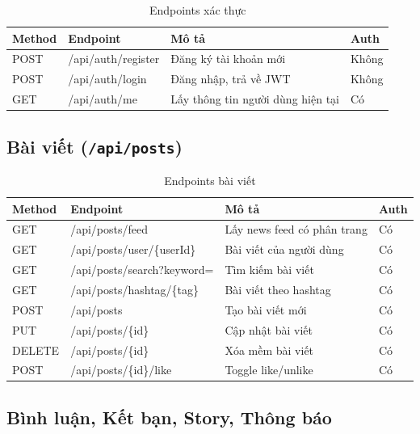\documentclass[a4paper]{article}
\begin{document}
\begin{table}[h!]
\centering
\caption{Endpoints xác thực}
\begin{tabularx}{\textwidth}{|l|l|X|l|}
\hline
\textbf{Method} & \textbf{Endpoint} & \textbf{Mô tả} & \textbf{Auth} \\
\hline
POST & /api/auth/register & Đăng ký tài khoản mới & Không \\
\hline
POST & /api/auth/login & Đăng nhập, trả về JWT & Không \\
\hline
GET & /api/auth/me & Lấy thông tin người dùng hiện tại & Có \\
\hline
\end{tabularx}
\end{table}

\subsection{Bài viết (\texttt{/api/posts})}

\begin{table}[h!]
\centering
\caption{Endpoints bài viết}
\begin{tabularx}{\textwidth}{|l|l|X|l|}
\hline
\textbf{Method} & \textbf{Endpoint} & \textbf{Mô tả} & \textbf{Auth} \\
\hline
GET & /api/posts/feed & Lấy news feed có phân trang & Có \\
\hline
GET & /api/posts/user/\{userId\} & Bài viết của người dùng & Có \\
\hline
GET & /api/posts/search?keyword= & Tìm kiếm bài viết & Có \\
\hline
GET & /api/posts/hashtag/\{tag\} & Bài viết theo hashtag & Có \\
\hline
POST & /api/posts & Tạo bài viết mới & Có \\
\hline
PUT & /api/posts/\{id\} & Cập nhật bài viết & Có \\
\hline
DELETE & /api/posts/\{id\} & Xóa mềm bài viết & Có \\
\hline
POST & /api/posts/\{id\}/like & Toggle like/unlike & Có \\
\hline
\end{tabularx}
\end{table}

\subsection{Bình luận, Kết bạn, Story, Thông báo}
\end{document}
